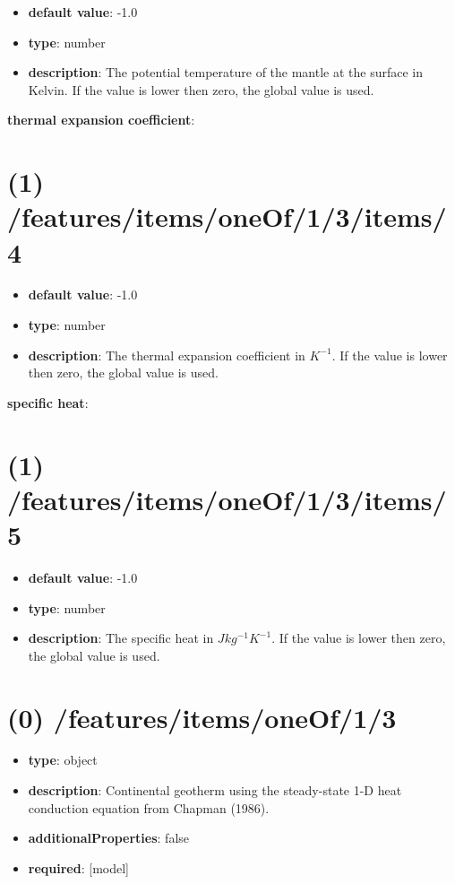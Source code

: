 \begin{itemize}[leftmargin=1em]\item {\bf default value}: -1.0
\item {\bf type}: number
\item {\bf description}: The potential temperature of the mantle at the surface in Kelvin. If the value is lower then zero, the global value is used.
\end{itemize}\item {\bf thermal expansion coefficient}: \section{(1) /features/items/oneOf/1/3/items/4}
\begin{itemize}[leftmargin=1em]\item {\bf default value}: -1.0
\item {\bf type}: number
\item {\bf description}: The thermal expansion coefficient in $K^{-1}$. If the value is lower then zero, the global value is used.
\end{itemize}\item {\bf specific heat}: \section{(1) /features/items/oneOf/1/3/items/5}
\begin{itemize}[leftmargin=1em]\item {\bf default value}: -1.0
\item {\bf type}: number
\item {\bf description}: The specific heat in $J kg^{-1} K^{-1}$. If the value is lower then zero, the global value is used.
\end{itemize}\section{(0) /features/items/oneOf/1/3}
\begin{itemize}[leftmargin=0em]\item {\bf type}: object
\item {\bf description}: Continental geotherm using the steady-state 1-D heat conduction equation from Chapman (1986).
\item {\bf additionalProperties}: false
\item {\bf required}: [model]\end{itemize}
